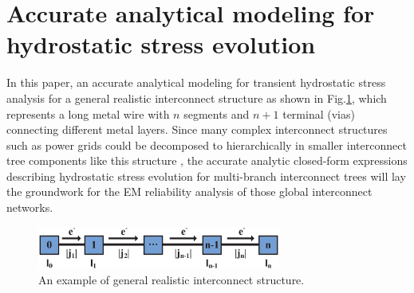 \section{Accurate analytical modeling for hydrostatic stress evolution}
\label{sec:multi_segment}
In this paper, an accurate analytical modeling for transient
hydrostatic stress analysis for a general realistic interconnect
structure as shown in Fig.\ref{fig:interconnect_tree}, which
represents a long metal wire with $n$ segments and $n+1$ terminal
(vias) connecting different metal layers. Since many complex
interconnect structures such as power grids could be decomposed to
hierarchically in smaller interconnect tree components like this
structure , the accurate analytic closed-form expressions describing
hydrostatic stress evolution for multi-branch interconnect trees will
lay the groundwork for the EM reliability analysis of those global
interconnect networks.

\label{sec:analytical_stress}
\begin{figure}[ht] \centering
\includegraphics[width=80mm]{Sn.eps}
\caption{An example of general realistic interconnect structure.}
  \label{fig:interconnect_tree}
  \vspace{-0.12in}
\end{figure}

